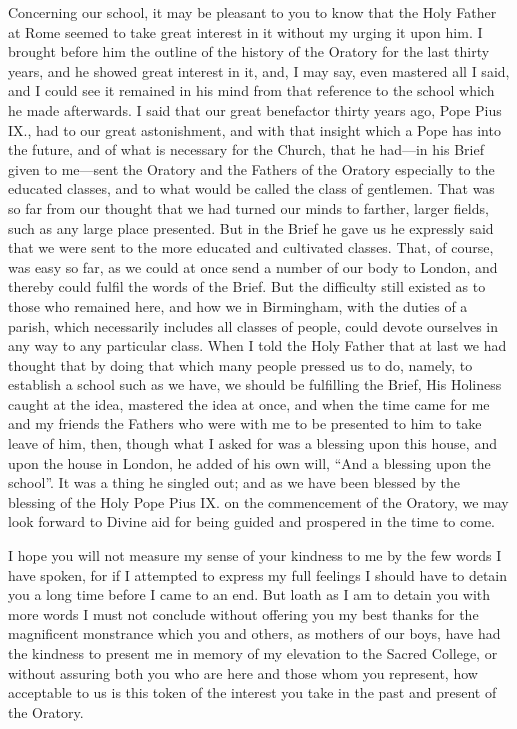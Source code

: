 Concerning our school, it may be pleasant to you to know that
the Holy Father at Rome seemed to take great interest in it without my
urging it upon him. I brought before him the outline of the history of
the Oratory for the last thirty years, and he showed great interest in
it, and, I may say, even mastered all I said, and I could see it
remained in his mind from that reference to the school which he made
afterwards. I said that our great benefactor thirty years ago, Pope
Pius IX., had to our great astonishment, and with that insight which a
Pope has into the future, and of what is necessary for the Church,
that he had—in his Brief given to me—sent the Oratory and the
Fathers of the Oratory especially to the educated classes, and to what
would be called the class of gentlemen. That was so far from our
thought that we had turned our minds to farther, larger fields, such
as any large place presented. But in the Brief he gave us he expressly
said that we were sent to the more educated and cultivated classes.
That, of course, was easy so far, as we could at once send a number of
our body to London, and thereby could fulfil the words of the Brief.
But the difficulty still existed as to those who remained here,
and how we in Birmingham, with the duties of a parish, which
necessarily includes all classes of people, could devote ourselves in
any way to any particular class. When I told the Holy Father that at
last we had thought that by doing that which many people pressed us to
do, namely, to establish a school such as we have, we should be
fulfilling the Brief, His Holiness caught at the idea, mastered the
idea at once, and when the time came for me and my friends the Fathers
who were with me to be presented to him to take leave of him, then,
though what I asked for was a blessing upon this house, and upon the
house in London, he added of his own will, ``And a blessing upon
the school''. It was a thing he singled out; and as we have been
blessed by the blessing of the Holy Pope Pius IX. on the commencement
of the Oratory, we may look forward to Divine aid for being guided and
prospered in the time to come.

I hope you will not measure my sense of your kindness to me by the
few words I have spoken, for if I attempted to express my full
feelings I should have to detain you a long time before I came
to an end. But loath as I am to detain you with more words I must not
conclude without offering you my best thanks for the magnificent
monstrance which you and others, as mothers of our boys, have had the
kindness to present me in memory of my elevation to the Sacred
College, or without assuring both you who are here and those whom you
represent, how acceptable to us is this token of the interest you take
in the past and present of the Oratory.

